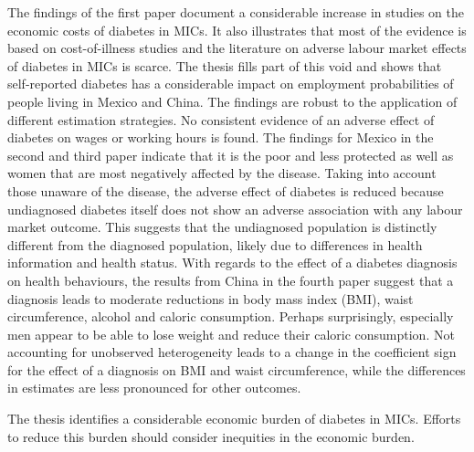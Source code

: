 The findings of the first paper document a considerable increase in studies on the economic costs of diabetes in \acp{MIC}. It also illustrates that most of the evidence is based on cost-of-illness studies and the literature on adverse labour market effects of diabetes in \acp{MIC} is scarce. The thesis fills part of this void and shows that self-reported diabetes has a considerable impact on employment probabilities of people living in Mexico and China. The findings are robust to the application of different estimation strategies. No consistent evidence of an adverse effect of diabetes on wages or working hours is found. The findings for Mexico in the second and third paper indicate that it is the poor and less protected as well as women that are most negatively affected by the disease. Taking into account those unaware of the disease, the adverse effect of diabetes is reduced because undiagnosed diabetes itself does not show an adverse association with any labour market outcome. This suggests that the undiagnosed population is distinctly different from the diagnosed population, likely due to differences in health information and health status. With regards to the effect of a diabetes diagnosis on health behaviours, the results from China in the fourth paper suggest that a diagnosis leads to moderate reductions in body mass index (BMI), waist circumference, alcohol and caloric consumption. Perhaps surprisingly, especially men appear to be able to lose weight and reduce their caloric consumption. Not accounting for unobserved heterogeneity leads to a change in the coefficient sign for the effect of a diagnosis on \ac{BMI} and waist circumference, while the differences in estimates are less pronounced for other outcomes.

The thesis identifies a considerable economic burden of diabetes in \acp{MIC}. Efforts to reduce this burden should consider inequities in the economic burden.



